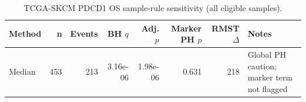\begin{table}[t]
\centering
\caption{TCGA-SKCM PDCD1 OS sample-rule sensitivity (all eligible samples).}
\label{tab:skcm-pdcd1-os-all-eligible-samples}
\begin{tabular}{lrrrrrrl}
\toprule
Method & n & Events & BH $q$ & Adj. $p$ & Marker PH $p$ & RMST $\Delta$ & Notes \\
\midrule
Median & 453 & 213 & 3.16e-06 & 1.98e-06 & 0.631 & 218 & Global PH caution; marker term not flagged \\
\bottomrule
\end{tabular}
\end{table}
